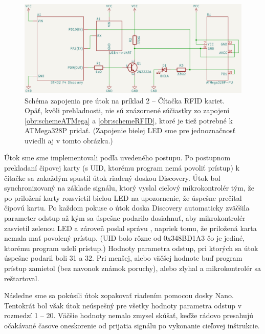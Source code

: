 \begin{figure}
    \centerline{\includegraphics[width=1\textwidth]{images/schemeCTF-RFID.png}}
    \caption[Schéma zapojenia pre útok na príklad 2]{Schéma zapojenia pre útok na príklad 2 -- Čítačka RFID kariet. Opäť, kvôli prehľadnosti, nie sú znázornené súčiastky zo zapojení \ref{obr:schemeATMega} a \ref{obr:schemeRFID}, ktoré je tiež potrebné k ATMega328P pridať. (Zapojenie bielej LED sme pre jednoznačnosť uviedli aj v tomto obrázku.)}
    \label{obr:schemeCTF-RFID}
\end{figure}

Útok sme  sme implementovali podľa uvedeného postupu. Po postupnom prekladaní čipovej karty (s UID, ktorému program nemá povoliť prístup) k čítačke sa zakaždým spustil útok riadený doskou Discovery. Útok bol synchronizovaný na základe signálu, ktorý vyslal cieľový mikrokontrolér tým, že po priložení karty rozsvietil bielou LED na upozornenie, že úspešne prečítal čipovú kartu. Po každom pokuse o útok doska Discovery automaticky zväčšila parameter odstup až kým sa úspešne podarilo dosiahnuť, aby mikrokontrolér zasvietil zelenou LED a zároveň poslal správu , napriek tomu, že priložená karta nemala mať povolený prístup. (UID bolo rôzne od 0x348BD1A3 čo je jediné, ktorému program udelí prístup.) Hodnoty parametra odstup, pri ktorých sa útok úspešne podaril boli 31 a 32. Pri menšej, alebo väčšej hodnote buď program prístup zamietol (bez navonok známok poruchy), alebo zlyhal a mikrokontrolér sa reštartoval.

Následne sme sa pokúsili útok zopakovať riadením pomocou dosky Nano. Tentokrát bol však útok neúspešný pre všetky hodnoty parametra odstup v rozmedzí 1 -- 20. Väčšie hodnoty nemalo zmysel skúšať, keďže rádovo presahujú očakávané časove oneskorenie od prijatia signálu po vykonanie cieľovej inštrukcie.